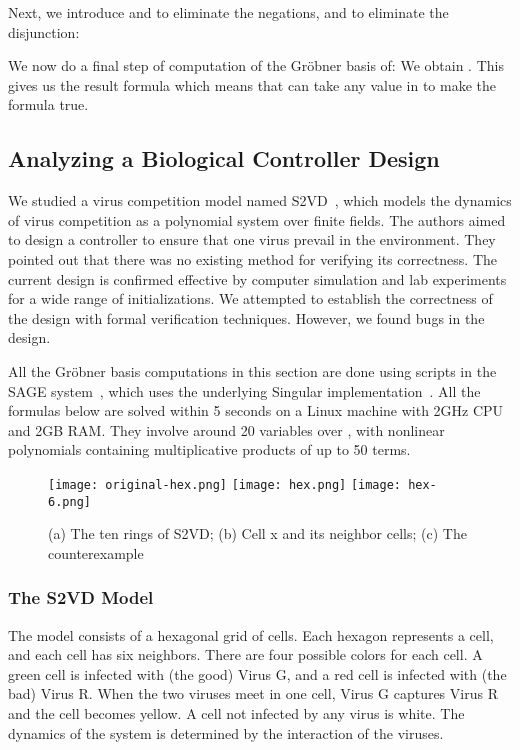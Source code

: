 \documentclass[envcountsect]{llncs}
\begin{document}
{{Next, we introduce  and  to eliminate the negations, and  to eliminate the disjunction: 

We now do a final step of computation of the Gr\"obner basis  of:
{}We obtain . This gives us the result formula  which means that  can take any value in  to make the formula true.
\subsection{Analyzing a Biological Controller Design}

We studied a virus competition model named S2VD~\cite{virus}, which models the dynamics of virus competition as a polynomial system over finite fields. The authors aimed to design a controller to ensure that one virus prevail in the environment. They pointed out that there was no existing method for verifying its correctness. The current design is confirmed effective by computer simulation and lab experiments for a wide range of initializations. We attempted to establish the correctness of the design with formal verification techniques. However, we found bugs in the design. 

All the Gr\"obner basis computations in this section are done using scripts in the SAGE system~\cite{sage}, which uses the underlying Singular implementation~\cite{singular}. All the formulas below are solved within 5 seconds on a Linux machine with 2GHz CPU and 2GB RAM. They involve around 20 variables over , with nonlinear polynomials containing multiplicative products of up to 50 terms.  

\begin{figure}[ht]
\centering
\label{fig}
\texttt{[image: original-hex.png]}\hspace{.25in}
\texttt{[image: hex.png]}\hspace{.25in}
\texttt{[image: hex-6.png]}
\caption{(a) The ten rings of S2VD; (b) Cell x and its neighbor  cells; (c) The counterexample}
\end{figure}

\subsubsection{The S2VD Model}The model consists of a hexagonal grid of cells. Each hexagon represents a cell, and each cell has six neighbors. There are four possible colors for each cell. A green cell is infected with (the good) Virus G, and a red cell is infected with (the bad) Virus R. When the two viruses meet in one cell, Virus G captures Virus R and the cell becomes yellow. A cell not infected by any virus is white. The dynamics of the system is determined by the interaction of the viruses. 

}}
\end{document}
